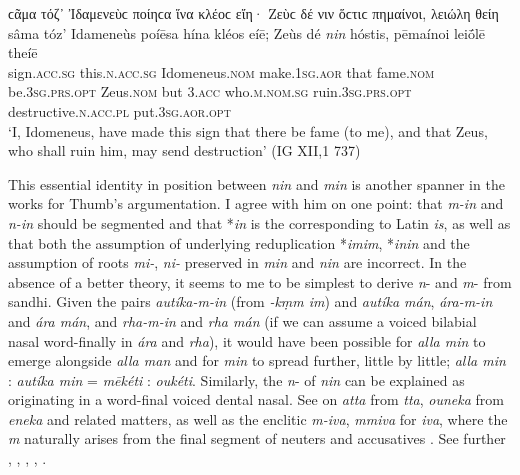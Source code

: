 \begin{exe}
\ex ϲᾶμα τόζ᾽ Ἰδαμενεὺϲ ποίηϲα ἵνα κλέοϲ εἴη· Ζεὺϲ δέ {νιν} ὅϲτιϲ πημαίνοι, λειώλη θείη\\
\gll sâma tóz' Idameneùs poíēsa hína kléos eíē; Zeùs dé \emph{nin} hóstis, pēmaínoi leiṓlē theíē\\
sign.\textsc{acc.sg} this.\textsc{n.acc.sg} Idomeneus.\textsc{nom} make.\textsc{1sg.aor} that fame.\textsc{nom} be.\textsc{3sg.prs.opt} Zeus.\textsc{nom} but \textsc{3.acc} who.\textsc{m.nom.sg} ruin.\textsc{3sg.prs.opt} destructive.\textsc{n.acc.pl} put.\textsc{3sg.aor.opt}\\
\trans `I, Idomeneus, have made this sign that there be fame (to me), and that Zeus, who shall ruin him, may send destruction' (IG XII,1 737)
\label{Rhodian}
\end{exe}

This essential identity in position between \emph{nin} and \emph{min} is another spanner in the works for Thumb's argumentation. I agree with him on one point: that \emph{m-in} and \emph{n-in} should be segmented and that *\emph{in} is the  corresponding to Latin \emph{is}, as well as that both the assumption of underlying reduplication *\emph{imim}, *\emph{inin} and the assumption of roots \emph{mi-}, \emph{ni-} preserved in \emph{min} and \emph{nin} are incorrect. In the absence of a better theory, it seems to me to be simplest to derive \emph{n}- and \emph{m}- from sandhi. Given the pairs \emph{autíka-m-in} (from \emph{-kṃm im}) and \emph{autíka mán}, \emph{ára-m-in} and \emph{ára mán}, and \emph{rha-m-in} and \emph{rha mán} (if we can assume a voiced bilabial nasal word-finally in \emph{ára} and \emph{rha}), it would have been possible for \emph{alla min} to emerge alongside \emph{alla man} and for \emph{min} to spread further, little by little; \emph{alla min} : \emph{autíka min} = \emph{mēkéti} : \emph{oukéti}. Similarly, the \emph{n}- of \emph{nin} can be explained as originating in a word-final voiced dental nasal. See \citet[119--125]{Wackernagel1887} on \emph{atta} from \emph{tta}, \emph{ouneka} from \emph{eneka} and related matters, as well as the  enclitic \emph{m-iva}, \emph{mmiva} for  \emph{iva}, where the \emph{m} naturally arises from the final segment of neuters and accusatives \citep[370]{Lassen1837}. See further \citet[423]{Tobler1877}, \citet[943f.]{Meyer1885}, \citet[1371]{Ziemer1885}, \citet[181]{Schuchardt1887}, \citet[167 fn]{Thielmann1889}.


